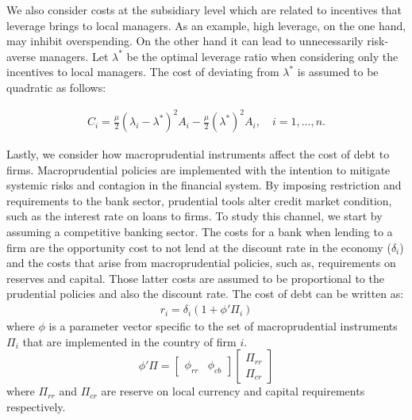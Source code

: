 \documentclass[12pt]{article}
\begin{document}
	We also consider costs at the subsidiary level which are related to incentives that leverage brings to local managers. As an example, high leverage, on the one hand, may inhibit overspending. On the other hand it can lead to unnecessarily risk-averse managers. Let $\lambda^*$ be the optimal leverage ratio when considering only the incentives to local managers. The cost of deviating from $\lambda^*$ is assumed to be quadratic as follows:  
	
	\begin{equation}
	\begin{aligned}
	C_i=\frac{\mu}{2}(\lambda_i-\lambda^*)^2A_i-\frac{\mu}{2}(\lambda^*)^2A_i, \quad i=1,...,n.
	\end{aligned}
	\label{eq:agency cost}
	\end{equation}
	
	Lastly, we consider how macroprudential instruments affect the cost of debt to firms. Macroprudential policies are implemented with the intention to mitigate systemic risks and contagion in the financial system. By imposing restriction and requirements to the bank sector, prudential tools alter credit market condition, such as the interest rate on loans to firms. To study this channel, we start by assuming a competitive banking sector. The costs for a bank when lending to a firm are the opportunity cost to not lend at the discount rate in the economy ($\delta_i$) and the costs that arise from macroprudential policies, such as, requirements on reserves and capital. Those latter costs are assumed to be proportional to the prudential policies and also the discount rate. The cost of debt can be written as:
	\begin{equation}
	\begin{aligned}
	r_i=\delta_i(1+\phi'\Pi_i)
	\end{aligned}
	\label{eq:cost of debt}
	\end{equation}
	where $\phi$ is a parameter vector specific to the set of macroprudential instruments $\Pi_i$ that are implemented in the country of firm $i$. 
	\begin{equation}
	\phi'\Pi=\begin{bmatrix}
	\phi_{rr} &  \phi_{cb}
	\end{bmatrix}
	\begin{bmatrix}
	\Pi_{rr} \\   
	\Pi_{cr} 
	\end{bmatrix}
	\label{eq:phi vector}
	\end{equation}
	where $\Pi_{rr}$ and $\Pi_{cr}$ are reserve on local currency and capital requirements respectively.
\end{document}
